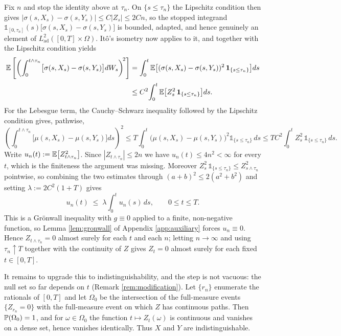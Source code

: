 Fix $n$ and stop the identity above at $\tau_n$. On $\{s \leq \tau_n\}$ the Lipschitz condition then gives
$|\sigma(s,X_s)-\sigma(s,Y_s)| \leq C|Z_s| \leq 2Cn$, so the stopped integrand
$\mathds{1}_{[0,\tau_n]}(s)\bigl[\sigma(s,X_s)-\sigma(s,Y_s)\bigr]$ is bounded, adapted, and hence
genuinely an element of $L^2_{\mathrm{ad}}([0,T]\times\Omega)$. Itô's isometry now applies to it, and together
with the Lipschitz condition yields
\[
\begin{aligned}
\mathbb{E}\left[\left(\int_0^{t\wedge\tau_n} \bigl[\sigma(s,X_s)-\sigma(s,Y_s)\bigr]dW_s\right)^{\!2}\right]
&= \int_0^{t} \mathbb{E}\bigl[(\sigma(s,X_s)-\sigma(s,Y_s))^2\,\mathbf{1}_{\{s\leq\tau_n\}}\bigr]ds \\[2pt]
&\leq C^2\!\int_0^t \mathbb{E}\bigl[Z_s^2\,\mathbf{1}_{\{s\leq\tau_n\}}\bigr]ds .
\end{aligned}
\]
For the Lebesgue term, the Cauchy--Schwarz inequality followed by the Lipschitz condition gives,
pathwise,
\[
\left(\int_0^{t\wedge\tau_n} \bigl[\mu(s,X_s)-\mu(s,Y_s)\bigr]ds\right)^{\!2}
\leq T\int_0^{t} \bigl(\mu(s,X_s)-\mu(s,Y_s)\bigr)^2 \mathds{1}_{\{s\leq\tau_n\}}\,ds
\leq T C^2\!\int_0^t Z_s^2\,\mathds{1}_{\{s\leq\tau_n\}}\,ds .
\]
Write $u_n(t) := \mathbb{E}\bigl[Z_{t\wedge\tau_n}^2\bigr]$. Since $|Z_{t\wedge\tau_n}| \leq 2n$ we
have $u_n(t) \leq 4n^2 < \infty$ for every $t$, which is the finiteness the argument was missing.
Moreover $Z_s^2\,\mathds{1}_{\{s\leq\tau_n\}} \leq Z_{s\wedge\tau_n}^2$ pointwise, so combining the
two estimates through $(a+b)^2 \leq 2(a^2+b^2)$ and setting $\lambda := 2C^2(1+T)$ gives
\[
u_n(t) \;\leq\; \lambda \int_0^t u_n(s)\,ds, \qquad 0 \leq t \leq T .
\]
This is a Grönwall inequality with $g \equiv 0$ applied to a finite, non-negative function, so Lemma
\ref{lem:gronwall} of Appendix \ref{app:auxiliary} forces $u_n \equiv 0$. Hence
$Z_{t\wedge\tau_n} = 0$ almost surely for each $t$ and each $n$; letting $n \to \infty$ and using
$\tau_n \uparrow T$ together with the continuity of $Z$ gives $Z_t = 0$ almost surely for each fixed
$t \in [0,T]$.

It remains to upgrade this to indistinguishability, and the step is not vacuous: the null set so far
depends on $t$ (Remark \ref{rem:modification}). Let $\{r_n\}$ enumerate the rationals of $[0,T]$ and
let $\Omega_0$ be the intersection of the full-measure events $\{Z_{r_n}=0\}$ with the full-measure
event on which $Z$ has continuous paths. Then $\mathbb{P}(\Omega_0)=1$, and for $\omega \in \Omega_0$
the function $t \mapsto Z_t(\omega)$ is continuous and vanishes on a dense set, hence vanishes
identically. Thus $X$ and $Y$ are indistinguishable. \qedfilledtext

